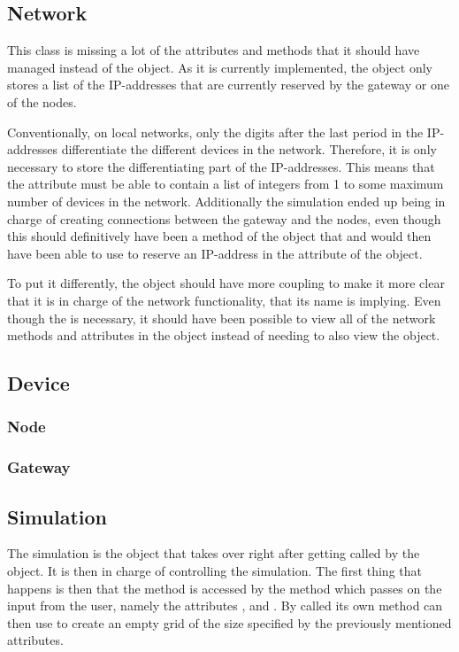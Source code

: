 \subsection{Network}
This class is missing a lot of the attributes and methods that it should have managed instead of the  object. As it is currently implemented, the  object only stores a list of the IP-addresses that are currently reserved by the gateway or one of the nodes.\bigbreak

\noindent Conventionally, on local networks, only the digits after the last period in the IP-addresses differentiate the different devices in the network. Therefore, it is only necessary to store the differentiating part of the IP-addresses. This means that the attribute  must be able to contain a list of integers from 1 to some maximum number of devices in the network. Additionally the simulation ended up being in charge of creating connections between the gateway and the nodes, even though this should definitively have been a method of the  object that  and  would then have been able to use to reserve an IP-address in the  attribute of the  object.\newline

\noindent To put it differently, the  object should have more coupling to make it more clear that it is in charge of the network functionality, that its name is implying. Even though the  is necessary, it should have been possible to view all of the network methods and attributes in the  object instead of needing to also view the  object.

\subsection{Device}


\subsubsection{Node}


\subsubsection{Gateway}


\subsection{Simulation}
The simulation is the object that takes over right after getting called by the  object. It is then in charge of controlling the simulation. The first thing that happens is then that the  method is accessed by the  method which passes on the input from the user, namely the attributes , and . By called its own method  can then use  to create an empty grid of the size specified by the previously mentioned attributes.\bigbreak

